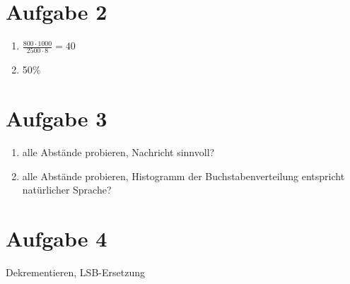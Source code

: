 \documentclass{article}
\begin{document}
	\section*{Aufgabe 2}
	\begin{enumerate}[label=(\alph*)]
		\item $\frac{800\cdot 1000}{2500\cdot 8} = 40$
		\item 50\%
	\end{enumerate}
	
	\section*{Aufgabe 3}
	\begin{enumerate}[label=(\alph*)]
		\item alle Abstände probieren, Nachricht sinnvoll?
		\item alle Abstände probieren, Histogramm der Buchstabenverteilung entspricht natürlicher Sprache?
	\end{enumerate}
	
	\section*{Aufgabe 4}
	Dekrementieren, LSB-Ersetzung
\end{document}
